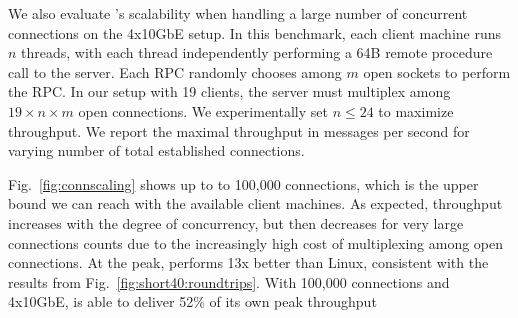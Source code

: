 \label{sec:eval:scale}

We also evaluate \ix's scalability when handling a large number of
concurrent connections on the 4x10GbE setup. In this benchmark, each client machine runs
$n$ threads, with each thread independently performing a 64B remote
procedure call to the server.  Each RPC randomly chooses among $m$
open sockets to perform the RPC.  In our setup with 19 clients, the
server must multiplex among $19 \times n \times m$ open connections.
We experimentally set $n \leq 24$ to maximize throughput.  We report
the maximal throughput in messages per second for varying number of
total established connections.


Fig.~\ref{fig:connscaling} shows up to to 100,000 connections, which
is the upper bound we can reach with the available client machines.
As expected, throughput increases with the degree of concurrency, but
then decreases for very large connections counts due to the
increasingly high cost of multiplexing among open connections.  At the
peak, \ix performs 13x better than Linux, consistent with the results
from Fig.~\ref{fig:short40:roundtrips}.  With 100,000 connections and
4x10GbE, \ix is able to deliver 52\% of its own peak
throughput


